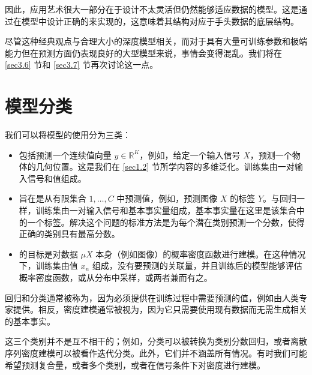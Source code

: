 因此，应用艺术很大一部分在于设计不太灵活但仍然能够适应数据的模型。这是通过在模型中设计正确的来实现的，这意味着其结构对应于手头数据的底层结构。

尽管这种经典观点与合理大小的深度模型相关，而对于具有大量可训练参数和极端能力但在预测方面仍表现良好的大型模型来说，事情会变得混乱。我们将在 \ref{sec3.6} 节和 \ref{sec3.7} 节再次讨论这一点。

\section{模型分类}

我们可以将模型的使用分为三类：

\begin{itemize}
    \item {}包括预测一个连续值向量 $y \in \mathbb{R}^K$，例如，给定一个输入信号 $X$，预测一个物体的几何位置。这是我们在 \ref{sec1.2} 节所学内容的多维泛化。训练集由一对输入信号和值组成。
    \item {}旨在是从有限集合 ${1,\dots,C}$ 中预测值，例如，预测图像 $X$ 的标签 $Y$。与回归一样，训练集由一对输入信号和基本事实量组成，基本事实量在这里是该集合中的一个标签。解决这个问题的标准方法是为每个潜在类别预测一个分数，使得正确的类别具有最高分数。
    \item {}的目标是对数据 $\mu X$ 本身（例如图像）的概率密度函数进行建模。在这种情况下，训练集由值 $x_n$ 组成，没有要预测的关联量，并且训练后的模型能够评估概率密度函数，或从分布中采样，或两者兼而有之。
\end{itemize}

回归和分类通常被称为，因为必须提供在训练过程中需要预测的值，例如由人类专家提供。相反，密度建模通常被视为，因为它只需要使用现有数据而无需生成相关的基本事实。

这三个类别并不是互不相干的；例如，分类可以被转换为类别分数回归，或者离散序列密度建模可以被看作迭代分类。此外，它们并不涵盖所有情况。有时我们可能希望预测复合量，或者多个类别，或者在信号条件下对密度进行建模。